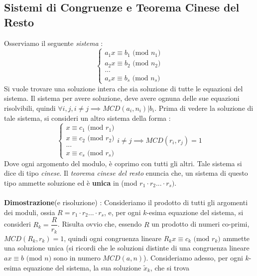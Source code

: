 \documentclass[12pt, letterpaper]{article}
\begin{document}
\subsection{Sistemi di Congruenze e Teorema Cinese del Resto}
Osserviamo il seguente \textit{sistema} :\begin{equation}
    \begin{cases}
        a_1x\equiv b_1 \text{ (mod }n_1\text{)}\\
        a_2x\equiv b_2 \text{ (mod }n_2\text{)}\\
        ...\\ a_sx\equiv b_s \text{ (mod }n_s\text{)}
    \end{cases}
\end{equation}
Si vuole trovare una soluzione intera che sia soluzione di tutte le equazioni del sistema. Il sistema 
per avere soluzione, deve avere ognuna delle sue equazioni risolvibili, quindi \(\forall i,j, i\ne j \implies MCD(a_i,n_i)|b_i\).
Prima di vedere la soluzione di tale sistema, si consideri un altro sistema della forma :\begin{equation}
    \begin{cases}
        x\equiv c_1 \text{ (mod }r_1\text{)}\\
        x\equiv c_2 \text{ (mod }r_2\text{)}\\
        ...\\ x\equiv c_s \text{ (mod }r_s\text{)}
    \end{cases} i\ne j \implies MCD(r_i,r_j)=1
\end{equation}
Dove ogni argomento del modulo, è coprimo con tutti gli altri. Tale sistema si dice di tipo \textit{cinese}.
Il \textit{teorema cinese del resto} enuncia che, un sistema 
di questo tipo ammette soluzione ed è \textbf{unica} in (mod \(r_1\cdot r_2...\cdot r_s)\).
\\\hphantom{.}\\\textbf{Dimostrazione}(e risoluzione) : Consideriamo il prodotto di tutti gli argomenti 
dei moduli, ossia \(R=r_1\cdot r_2...\cdot r_s\), e, per ogni \(k\)-esima equazione del sistema, si consideri
\(R_k=\dfrac{R}{r_k}\). Risulta ovvio che, essendo \(R\) un prodotto di numeri co-primi, \(MCD(R_k,r_k)=1\), 
quindi ogni congruenza lineare \(R_kx\equiv c_k \text{ (mod }r_k\text{)}\) ammette una soluzione unica (si ricordi 
che le soluzioni distinte di una congruenza lineare \(ax\equiv b \text{ (mod }n\text{)}\) sono in numero \(MCD(a,n)\)).
Consideriamo adesso, per ogni \(k\)-esima equazione del sistema, la sua soluzione \(\tilde x_k\), che si trova 
\end{document}
